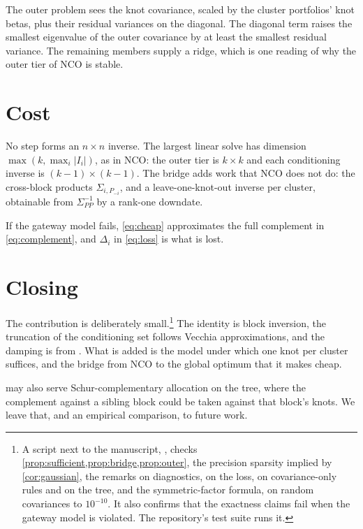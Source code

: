 \documentclass[11pt]{article}
\begin{document}
The outer problem sees the knot covariance, scaled by the cluster
portfolios' knot betas, plus their residual variances on the diagonal. The
diagonal term raises the smallest eigenvalue of the outer covariance by at
least the smallest residual variance. The remaining members supply a ridge, which
is one reading of why the outer tier of NCO is stable.

\section{Cost}

No step forms an $n\times n$ inverse. The largest linear solve has dimension
$\max(k,\max_i|I_i|)$, as in NCO: the outer tier is $k\times k$ and each
conditioning inverse is $(k-1)\times(k-1)$. The bridge adds work that NCO
does not do: the cross-block products $\Sigma_{i,P_{-i}}$, and a
leave-one-knot-out inverse per cluster, obtainable from $\Sigma_{PP}^{-1}$
by a rank-one downdate.

If the gateway model fails, \eqref{eq:cheap} approximates the full
complement in \eqref{eq:complement}, and $\Delta_i$ in \eqref{eq:loss} is
what is lost.

\section{Closing}

The contribution is deliberately small.\footnote{A script next to the
manuscript, , checks
\cref{prop:sufficient,prop:bridge,prop:outer}, the precision sparsity
implied by \cref{cor:gaussian}, the remarks on diagnostics, on the loss, on
covariance-only rules and on the tree, and the symmetric-factor formula,
on random covariances to $10^{-10}$. It also confirms that the exactness
claims fail when the gateway model is violated. The repository's test suite
runs it.} The identity is block inversion, the
truncation of the conditioning set follows Vecchia approximations, and the
damping is from
\textcite{cotton2024schur}. What is added is the model under which one knot
per cluster suffices, and the bridge from NCO to the global optimum that it
makes cheap.

 may also serve Schur-complementary allocation on the
tree, where the complement against a sibling block could be taken against
that block's knots. We leave that, and an empirical comparison, to future
work.

\printbibliography
\end{document}
